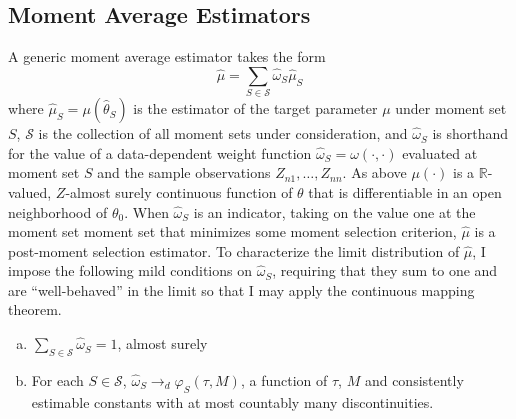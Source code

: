 \subsection{Moment Average Estimators}
A generic moment average estimator takes the form
\begin{equation}
	\label{eq:avg}
	\widehat{\mu}=\sum_{S \in \mathscr{S}} \widehat{\omega}_S\widehat{\mu}_S
\end{equation}
where $\widehat{\mu}_S = \mu(\widehat{\theta}_S)$ is the estimator of the target parameter $\mu$ under moment set $S$, $\mathscr{S}$ is the collection of all moment sets under consideration, and $\widehat{\omega}_S$ is shorthand for the value of a data-dependent weight function $\widehat{\omega}_S=\omega(\cdot, \cdot)$ evaluated at moment set $S$ and the sample observations $Z_{n1}, \hdots, Z_{nn}$.  
As above $\mu(\cdot)$ is a $\mathbb{R}$-valued, $Z$-almost surely continuous function of $\theta$ that is differentiable in an open neighborhood of $\theta_0$. 
When $\widehat{\omega}_S$ is an indicator, taking on the value one at the moment set moment set that minimizes some moment selection criterion, $\widehat{\mu}$ is a post-moment selection estimator. 
To characterize the limit distribution of $\widehat{\mu}$, I impose the following mild conditions on $\widehat{\omega}_S$, requiring that they sum to one and are ``well-behaved'' in the limit so that I may apply the continuous mapping theorem.
\begin{assump}\mbox{}
\label{assump:weights}
\begin{enumerate}[(a)]
	\item $\sum_{S \in \mathscr{S}} \widehat{\omega}_S = 1$, almost surely 
	\item For each $S\in \mathscr{S}$, $\widehat{\omega}_S \rightarrow_d\varphi_S(\tau, M)$, a function of $\tau$, $M$ and consistently estimable constants with at most countably many discontinuities.
\end{enumerate}
\end{assump}

